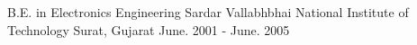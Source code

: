 

\begin{cventries}

  \cventry
    {B.E. in Electronics Engineering} %
    {Sardar Vallabhbhai National Institute of Technology} %
    {Surat, Gujarat} %
    {June. 2001 - June. 2005} %
    {
      \begin{cvitems} %
      \end{cvitems}
    }

\end{cventries}
